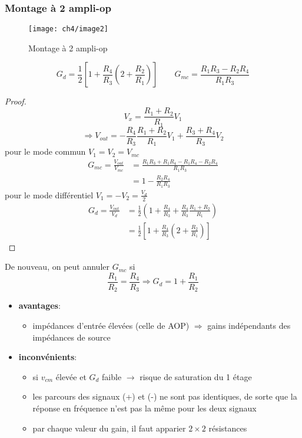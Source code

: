 \subsubsection{Montage à 2 ampli-op}
\begin{figure}[H] 
	\centering 
	\texttt{[image: ch4/image2]} 
	\caption{Montage à 2 ampli-op} 
\end{figure}
\[G_d = \frac{1}{2}\left[1+\frac{R_4}{R_3}\left(2+\frac{R_2}{R_1}\right)\right]\qquad G_{mc} = \frac{R_1R_3-R_2R_4}{R_1R_3}\]
\begin{proof}
	\[V_x = \frac{R_1+R_2}{R_1}V_1\]
	\[\Rightarrow V_{out} = -\frac{R_4}{R_3}\frac{R_1+R_2}{R_1}V_1+\frac{R_3+R_4}{R_3}V_2\]
	pour le mode commun \(V_1=V_2=V_{mc}\)
	\begin{align*}
		G_{mc} = \frac{V_{out}}{V_{mc}} &=\frac{R_1R_3+R_1R_4-R_1R_4-R_2R_4}{R_1R_3}\\
		&= 1-\frac{R_2R_4}{R_1R_3}
	\end{align*}
	pour le mode différentiel \(V_1=-V_2=\frac{V_d}{2}\)
	\begin{align*}
		G_d=\frac{V_{out}}{V_d} &= \frac{1}{2}\left(1+\frac{R_4}{R_3}+\frac{R_4}{R_3}\frac{R_1+R_2}{R_1}\right)\\
		&= \frac{1}{2}\left[1+\frac{R_4}{R_3}\left(2+\frac{R_2}{R_1}\right)\right]
	\end{align*}
\end{proof}
De nouveau, on peut annuler \(G_{mc}\) si 
\[\frac{R_1}{R_2}=\frac{R_4}{R_3}\Rightarrow G_d = 1+\frac{R_1}{R_2}\]
\begin{itemize}
	\item \textbf{avantages}:
	\begin{itemize}
		\item impédances d'entrée élevées (celle de AOP) \(\Rightarrow\) gains indépendants des impédances de source
	\end{itemize} 
	\item \textbf{inconvénients}:
	\begin{itemize}
		\item si \(v_{cm}\) élevée et \(G_d\) faible \(\rightarrow\) risque de saturation du 1 étage
		\item les parcours des signaux (+) et (-) ne sont pas identiques, de sorte que la réponse en fréquence n'est pas la même pour les deux signaux
		\item par chaque valeur du gain, il faut apparier \(2\times 2\) résistances
	\end{itemize}
\end{itemize}
